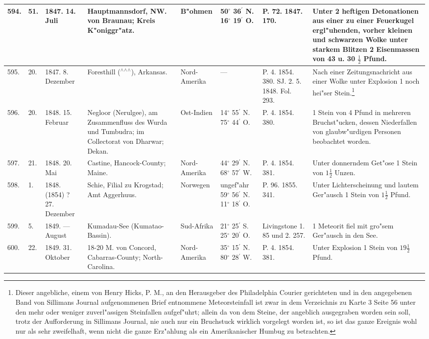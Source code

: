 \documentclass[a4paper, 8pt, oneside, polutonikogreek, german]{article}
\begin{document}
\begin{center}
\begin{longtable}{| p{5mm} | p{3mm} | p{15mm} | p{25mm} | p{20mm} | p{14mm} | p{17mm} | p{24mm} |}
        594. & 51. & 1847. 14. Juli & Hauptmannsdorf, NW. von Braunau; Kreis K"oniggr"atz. & B"ohmen & 50$^\circ$ 36$^\prime$ N. 16$^\circ$ 19$^\prime$ O. & P. 72. 1847. 170. & Unter 2 heftigen Detonationen aus einer zu einer Feuerkugel ergl"uhenden, vorher kleinen und schwarzen Wolke unter starkem Blitzen 2 Eisenmassen von 43 u. 30 $\frac{1}{2}$ Pfund. \\ \hline
        595. & 20. & 1847. 8. Dezember & Foresthill ($^\wedge$$^\wedge$$^\wedge$), Arkansas. & Nord-Amerika & --- & P. 4. 1854. 380. SJ. 2. 5. 1848. Fol. 293. & Nach einer Zeitungsnachricht aus einer Wolke unter Explosion 1 noch hei"ser Stein.\footnote{Dieser angebliche, einem von Henry Hicks, P. M., an den Herausgeber des Philadelphia Courier gerichteten und in den angegebenen Band von Sillimans Journal aufgenommenen Brief entnommene Meteorsteinfall ist zwar in dem Verzeichnis zu Karte 3 Seite 56 unter den mehr oder weniger zuverl"assigen Steinfallen aufgef"uhrt; allein da von dem Steine, der angeblich ausgegraben worden sein soll, trotz der Aufforderung in Sillimans Journal, nie auch nur ein Bruchstuck wirklich vorgelegt worden ist, so ist das ganze Ereignis wohl nur als sehr zweifelhaft, wenn nicht die ganze Erz"ahlung als ein Amerikanischer Humbug zu betrachten.} \\ \hline
        596. & 20. & 1848. 15. Februar & Negloor (Nerulgee), am Zusammenfluss des Wurda und Tumbudra; im Collectorat von Dharwar; Dekan. & Ost-Indien & 14$^\circ$ 55$^\prime$ N. 75$^\circ$ 44$^\prime$ O. & P. 4. 1854. 380. & 1 Stein von 4 Pfund in mehreren Bruchst"ucken, dessen Niederfallen von glaubw"urdigen Personen beobachtet worden. \\ \hline
        597. & 21. & 1848. 20. Mai & Castine, Hancock-County; Maine. & Nord-Amerika & 44$^\circ$ 29$^\prime$ N. 68$^\circ$ 57$^\prime$ W. & P. 4. 1854. 381. & Unter donnerndem Get"ose 1 Stein von $1\frac{1}{2}$ Unzen. \\ \hline
        598. & 1. & 1848. (1854) ? 27. Dezember & Schie, Filial zu Krogstad; Amt Aggerhuus. & Norwegen & ungef"ahr 59$^\circ$ 56$^\prime$ N. 11$^\circ$ 18$^\prime$ O. & P. 96. 1855. 341. & Unter Lichterscheinung und lautem Ger"ausch 1 Stein von $1\frac{1}{2}$ Pfund. \\ \hline
        599. & 5. & 1849. --- August & Kumadau-See (Kumatao-Bassin). & Sud-Afrika & 21$^\circ$ 25$^\prime$ S. 25$^\circ$ 20$^\prime$ O. & Livingstone 1. 85 und 2. 257. & 1 Meteorit fiel mit gro"sem Ger"ausch in den See. \\ \hline
        600. & 22. & 1849. 31. Oktober & 18-20 M. von Concord, Cabarras-County; North-Carolina. & Nord-Amerika & 35$^\circ$ 15$^\prime$ N. 80$^\circ$ 28$^\prime$ W. & P. 4. 1854. 381. & Unter Explosion 1 Stein von $19\frac{1}{2}$ Pfund. \\ \hline

\end{longtable}
\end{center}
\end{document}
